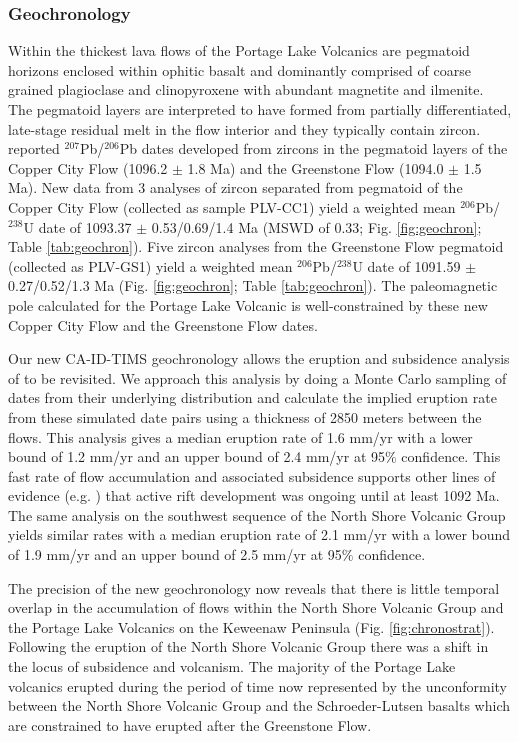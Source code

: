 \documentclass[11pt,letterpaper]{article}
\begin{document}
\subsubsection{Geochronology}

Within the thickest lava flows of the Portage Lake Volcanics are pegmatoid horizons enclosed within ophitic basalt and dominantly comprised of coarse grained plagioclase and clinopyroxene with abundant magnetite and ilmenite. The pegmatoid layers are interpreted to have formed from partially differentiated, late-stage residual melt in the flow interior \citep{Longo1984a} and they typically contain zircon. \cite{Davis1990a} reported $^{207}$Pb/$^{206}$Pb dates developed from zircons in the pegmatoid layers of the Copper City Flow (1096.2 $\pm$ 1.8 Ma) and the Greenstone Flow (1094.0 $\pm$ 1.5 Ma). New data from 3 analyses of zircon separated from pegmatoid of the Copper City Flow (collected as sample PLV-CC1) yield a weighted mean $^{206}$Pb/$^{238}$U date of 1093.37 $\pm$ 0.53/0.69/1.4 Ma (MSWD of 0.33; Fig. \ref{fig:geochron}; Table \ref{tab:geochron}). Five zircon analyses from the Greenstone Flow pegmatoid (collected as PLV-GS1) yield a weighted mean $^{206}$Pb/$^{238}$U date of 1091.59 $\pm$ 0.27/0.52/1.3 Ma (Fig. \ref{fig:geochron}; Table \ref{tab:geochron}). The paleomagnetic pole calculated for the Portage Lake Volcanic is well-constrained by these new Copper City Flow and the Greenstone Flow dates.

Our new CA-ID-TIMS geochronology allows the eruption and subsidence analysis of \cite{Davis1990a} to be revisited. We approach this analysis by doing a Monte Carlo sampling of dates from their underlying distribution and calculate the implied eruption rate from these simulated date pairs using a thickness of 2850 meters between the flows. This analysis gives a median eruption rate of 1.6 mm/yr with a lower bound of 1.2 mm/yr and an upper bound of 2.4 mm/yr at 95$\%$ confidence. This fast rate of flow accumulation and associated subsidence supports other lines of evidence (e.g. \citealp{Fairchild2017a}) that active rift development was ongoing until at least 1092 Ma. The same analysis on the southwest sequence of the North Shore Volcanic Group yields similar rates with a median eruption rate of 2.1 mm/yr with a lower bound of 1.9 mm/yr and an upper bound of 2.5 mm/yr at 95$\%$ confidence.

The precision of the new geochronology now reveals that there is little temporal overlap in the accumulation of flows within the North Shore Volcanic Group and the Portage Lake Volcanics on the Keweenaw Peninsula (Fig. \ref{fig:chronostrat}). Following the eruption of the North Shore Volcanic Group there was a shift in the locus of subsidence and volcanism. The majority of the Portage Lake volcanics erupted during the period of time now represented by the unconformity between the North Shore Volcanic Group and the Schroeder-Lutsen basalts which are constrained to have erupted after the Greenstone Flow.
\end{document}

